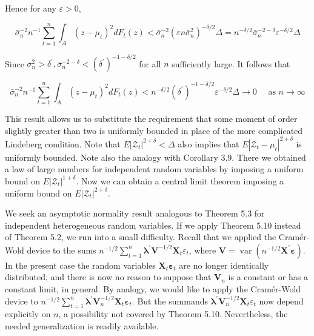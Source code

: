 \documentclass[10pt]{article}
\begin{document}
Hence for any $\varepsilon>0$,

$$
\bar{\sigma}_{n}^{-2} n^{-1} \sum_{t=1}^{n} \int_{A}\left(z-\mu_{t}\right)^{2} d F_{t}(z)<\bar{\sigma}_{n}^{-2}\left(\varepsilon n \bar{\sigma}_{n}^{2}\right)^{-\delta / 2} \Delta=n^{-\delta / 2} \bar{\sigma}_{n}^{-2-\delta} \varepsilon^{-\delta / 2} \Delta
$$

Since $\bar{\sigma}_{n}^{2}>\delta^{\prime}, \bar{\sigma}_{n}^{-2-\delta}<\left(\delta^{\prime}\right)^{-1-\delta / 2}$ for all $n$ sufficiently large. It follows that

$$
\bar{\sigma}_{n}^{-2} n^{-1} \sum_{t=1}^{n} \int_{A}\left(z-\mu_{t}\right)^{2} d F_{t}(z)<n^{-\delta / 2}\left(\delta^{\prime}\right)^{-1-\delta / 2} \varepsilon^{-\delta / 2} \Delta \rightarrow 0 \quad \text { as } n \rightarrow \infty
$$

This result allows us to substitute the requirement that some moment of order slightly greater than two is uniformly bounded in place of the more complicated Lindeberg condition. Note that $E\left|\mathcal{Z}_{t}\right|^{2+\delta}<\Delta$ also implies that $E\left|\mathcal{Z}_{t}-\mu_{t}\right|^{2+\delta}$ is uniformly bounded. Note also the analogy with Corollary 3.9. There we obtained a law of large numbers for independent random variables by imposing a uniform bound on $E\left|\mathcal{Z}_{t}\right|^{1+\delta}$. Now we can obtain a central limit theorem imposing a uniform bound on $E\left|\mathcal{Z}_{t}\right|^{2+\delta}$.

We seek an asymptotic normality result analogous to Theorem 5.3 for independent heterogeneous random variables. If we apply Theorem 5.10 instead of Theorem 5.2, we run into a small difficulty. Recall that we applied the Cramér-Wold device to the sums $n^{-1 / 2} \sum_{t=1}^{n} \boldsymbol{\lambda}^{\prime} \mathbf{V}^{-1 / 2} \mathbf{X}_{t} \varepsilon_{t}$, where $\mathbf{V}= \operatorname{var}\left(n^{-1 / 2} \mathbf{X}^{\prime} \boldsymbol{\varepsilon}\right)$. In the present case the random variables $\mathbf{X}_{t} \boldsymbol{\varepsilon}_{t}$ are no longer identically distributed, and there is now no reason to suppose that $\mathbf{V}_{n}$ is a constant or has a constant limit, in general. By analogy, we would like to apply the Cramér-Wold device to $n^{-1 / 2} \sum_{t=1}^{n} \boldsymbol{\lambda}^{\prime} \mathbf{V}_{n}^{-1 / 2} \mathbf{X}_{t} \boldsymbol{\varepsilon}_{t}$. But the summands $\boldsymbol{\lambda}^{\prime} \mathbf{V}_{n}^{-1 / 2} \mathbf{X}_{t} \varepsilon_{t}$ now depend explicitly on $n$, a possibility not covered by Theorem 5.10. Nevertheless, the needed generalization is readily available.
\end{document}
